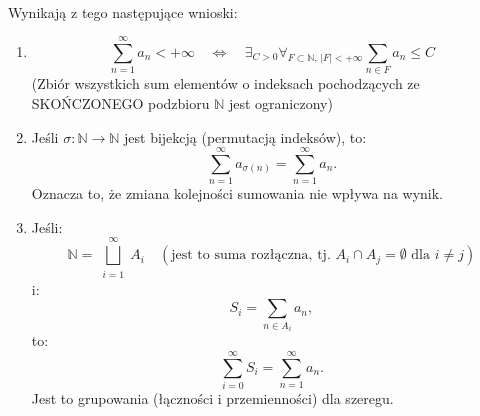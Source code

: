 \documentclass{article}
\numberwithin{defi}{section}
\numberwithin{defi}{section}
\newcommand{\N}{\mathbb{N}}
\newcommand{\oo}{\infty}
\begin{document}
\paragraph{} Wynikają z tego następujące wnioski:
\begin{twier}{}
    \begin{enumerate}
        \item \[\sum_{n = 1}^{\infty} a_n < + \infty \quad \iff \quad \exists_{C>0} \forall_{F \subset \N ,\, |F| < +\oo}  \sum_{n \in F} a_n \leqslant C\]
              (Zbiór wszystkich sum elementów o indeksach pochodzących ze SKOŃCZONEGO podzbioru $\N$ jest ograniczony)
        \item Jeśli $\sigma : \N \rightarrow \N$ jest bijekcją (permutacją indeksów), to:
              \[\sum_{n=1}^{\oo} a_{\sigma(n)} = \sum_{n=1}^{\oo} a_{n}.\]
              Oznacza to, że zmiana kolejności sumowania nie wpływa na wynik.
        \item Jeśli:
              \[\N = \bigsqcup_{\substack{i=1}}^{\oo} A_i \quad (\text{jest to suma rozłączna, tj. } A_i \cap A_j = \emptyset \text{ dla } i \neq j)\]
              i:
              \[S_i = \sum_{n \in A_i} a_n,\]
              to:
              \[\sum_{i=0}^{\oo}S_i  = \sum_{n=1}^{\oo}a_n.  \]
              Jest to grupowania (łączności i przemienności) dla szeregu.
    \end{enumerate}
\end{twier}
\end{document}
